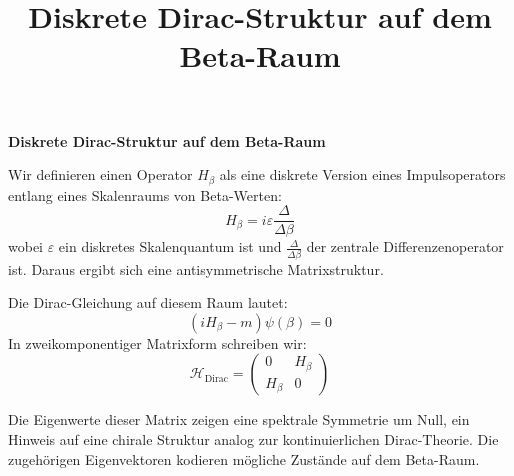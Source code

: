 \documentclass[a4paper,12pt]{article}
\title{Diskrete Dirac-Struktur auf dem Beta-Raum}
\author{}
\date{}
\begin{document}
\maketitle

\textbf{Diskrete Dirac-Struktur auf dem Beta-Raum}

Wir definieren einen Operator $H_\beta$ als eine diskrete Version eines Impulsoperators entlang eines Skalenraums von Beta-Werten:
\[
H_\beta = i\varepsilon \frac{\Delta}{\Delta \beta}
\]
wobei $\varepsilon$ ein diskretes Skalenquantum ist und $\frac{\Delta}{\Delta \beta}$ der zentrale Differenzenoperator ist. Daraus ergibt sich eine antisymmetrische Matrixstruktur.

Die Dirac-Gleichung auf diesem Raum lautet:
\[
\left( i H_\beta - m \right)\psi(\beta) = 0
\]
In zweikomponentiger Matrixform schreiben wir:
\[
\mathcal{H}_{\text{Dirac}} =
\begin{pmatrix}
0 & H_\beta \\
H_\beta & 0
\end{pmatrix}
\]

Die Eigenwerte dieser Matrix zeigen eine spektrale Symmetrie um Null, ein Hinweis auf eine chirale Struktur analog zur kontinuierlichen Dirac-Theorie. Die zugehörigen Eigenvektoren kodieren mögliche Zustände auf dem Beta-Raum.
\end{document}
